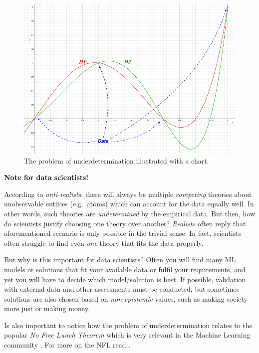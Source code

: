 \documentclass[
]{book}
\begin{document}
\begin{figure}

{\centering \includegraphics[width=0.75\linewidth]{Figures/underdetermination_small} 

}

\caption{The problem of underdetermination illustrated with a chart.}\label{fig:chart-underdetermination}
\end{figure}

\begin{tipbox}

\textbf{Note for data scientists!}

According to \emph{anti-realists}, there will always be multiple \emph{competing} theories about unobservable entities (e.g.~atoms) which can account for the data equally well. In other words, such theories are \emph{undetermined} by the empirical data. But then, how do scientists justify choosing one theory over another? \emph{Realists} often reply that aforementioned scenario is only possible in the trivial sense. In fact, scientists often struggle to find even \emph{one} theory that fits the data properly.

But why is this important for data scientists? Often you will find many ML models or solutions that fit your available data or fulfil your requirements, and yet you will have to decide which model/solution is best. If possible, validation with external data and other assessments must be conducted, but sometimes solutions are also chosen based on \emph{non-epistemic} values, such as making society more just or making money.

Is also important to notice how the problem of underdetermination relates to the popular \emph{No Free Lunch Theorem} which is very relevant in the Machine Learning community \citep{dotan2020theory}. For more on the NFL read \citep{domingos2015master}.

\end{tipbox}
\end{document}
